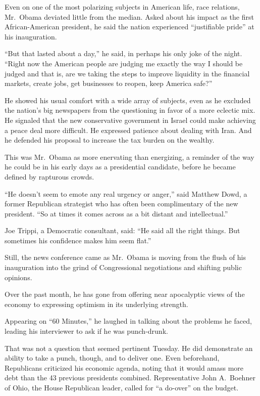 \documentclass[12pt,a4paper,onecolumn]{article}
\begin{document}
\begin{CJK*}{GBK}{song}
Even on one of the most polarizing subjects in American life, race relations, Mr.~Obama deviated
little from the median. Asked about his impact as the first African-American president, he said the
nation experienced ``justifiable pride'' at his inauguration.

``But that lasted about a day,'' he said, in perhaps his only joke of the night. ``Right now the
American people are judging me exactly the way I should be judged and that is, are we taking the
steps to improve liquidity in the financial markets, create jobs, get businesses to reopen, keep
America safe?''

He showed his usual comfort with a wide array of subjects, even as he excluded the nation's big
newspapers from the questioning in favor of a more eclectic mix. He signaled that the new
conservative government in Israel could make achieving a peace deal more difficult. He expressed
patience about dealing with Iran. And he defended his proposal to increase the tax burden on the
wealthy.

This was Mr.~Obama as more enervating than energizing, a reminder of the way he could be in his
early days as a presidential candidate, before he became defined by rapturous crowds.

``He doesn't seem to emote any real urgency or anger,'' said Matthew Dowd, a former Republican
strategist who has often been complimentary of the new president. ``So at times it comes across as a
bit distant and intellectual.''

Joe Trippi, a Democratic consultant, said: ``He said all the right things. But sometimes his
confidence makes him seem flat.''

Still, the news conference came as Mr.~Obama is moving from the flush of his inauguration into the
grind of Congressional negotiations and shifting public opinions.

Over the past month, he has gone from offering near apocalyptic views of the economy to expressing
optimism in its underlying strength.

Appearing on ``60 Minutes,'' he laughed in talking about the problems he faced, leading his
interviewer to ask if he was punch-drunk.

That was not a question that seemed pertinent Tuesday. He did demonstrate an ability to take a
punch, though, and to deliver one. Even beforehand, Republicans criticized his economic agenda,
noting that it would amass more debt than the 43 previous presidents combined. Representative John
A.~Boehner of Ohio, the House Republican leader, called for ``a do-over'' on the budget.


\end{CJK*}
\end{document}
